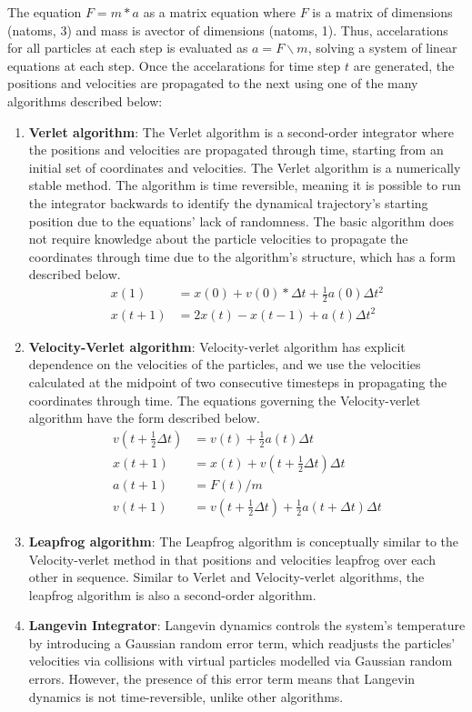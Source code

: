 The equation $F = m*a$ as a matrix equation where $F$ is a matrix of dimensions (natoms, 3) and mass is avector of dimensions (natoms, 1). Thus, accelarations for all particles at each step is evaluated as $a = F \backslash m$, solving a system of linear equations at each step. Once the accelarations for time step $t$ are generated, the positions and velocities are propagated to the next using one of the many algorithms described below:
\begin{enumerate}
    \item \textbf{Verlet algorithm}: The Verlet algorithm is a second-order integrator where the positions and velocities are propagated through time, starting from an initial set of coordinates and velocities. The Verlet algorithm is a numerically stable method. The algorithm is time reversible, meaning it is possible to run the integrator backwards to identify the dynamical trajectory's starting position due to the equations' lack of randomness. The basic algorithm does not require knowledge about the particle velocities to propagate the coordinates through time due to the algorithm's structure, which has a form described below.
    \begin{align*}
        x(1) &= x(0) + v(0)*\Delta t + \frac{1}{2}a(0)\Delta{t^2} \\
        x(t+1) &= 2x(t) - x(t-1) + a(t)\Delta{t^2}
    \end{align*}
    \item \textbf{Velocity-Verlet algorithm}: Velocity-verlet algorithm has explicit dependence on the velocities of the particles, and we use the velocities calculated at the midpoint of two consecutive timesteps in propagating the coordinates through time. The equations governing the Velocity-verlet algorithm have the form described below.
    \begin{align*}
        v(t + \frac{1}{2}\Delta{t}) &= v(t) + \frac{1}{2}a(t)\Delta{t} \\
        x(t+1) &= x(t) + v(t+ \frac{1}{2}\Delta{t})\Delta{t} \\
        a(t+1) &= F(t)/m \\
        v(t+1) &= v(t+\frac{1}{2}\Delta{t}) + \frac{1}{2}a(t+\Delta{t})\Delta{t}
    \end{align*}
    \item \textbf{Leapfrog algorithm}: The Leapfrog algorithm is conceptually similar to the Velocity-verlet method in that positions and velocities leapfrog over each other in sequence. Similar to Verlet and Velocity-verlet algorithms, the leapfrog algorithm is also a second-order algorithm. 
    \item \textbf{Langevin Integrator}: Langevin dynamics controls the system's temperature by introducing a Gaussian random error term, which readjusts the particles' velocities via collisions with virtual particles modelled via Gaussian random errors. However, the presence of this error term means that Langevin dynamics is not time-reversible, unlike other algorithms.
\end{enumerate}

